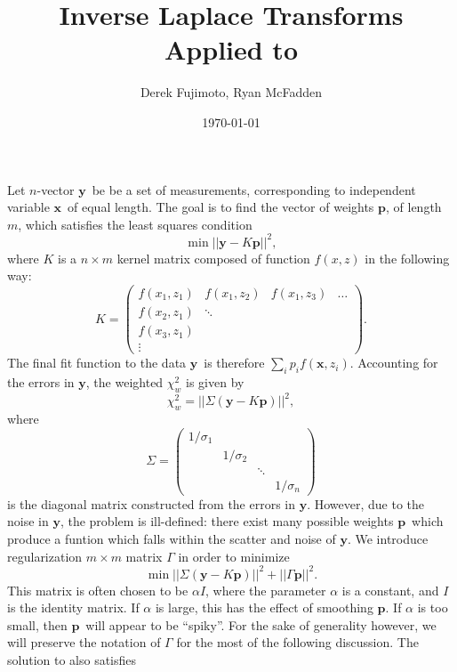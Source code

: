 \documentclass{article}
\title{Inverse Laplace Transforms Applied to \bnmr}
\author{Derek Fujimoto, Ryan McFadden}
\date{\today}
\newcommand{\y}{\ensuremath{\bm{y}}}
\newcommand{\p}{\ensuremath{\bm{p}}}
\newcommand{\x}{\ensuremath{\bm{x}}}
\begin{document}
\maketitle

Let $n$-vector \y\ be be a set of measurements, corresponding to independent variable \x\ of equal length. The goal is to find the vector of weights \p, of length $m$, which satisfies the least squares condition
%
\begin{equation}
\min ||\y-K\p||^2,
\end{equation}
%
where $K$ is a $n\times m$ kernel matrix composed of function $f(x,z)$ in the following way:
%
\begin{equation}\label{eq:K}
K = \left(
	\begin{array}{cccc}
	f(x_1,z_1) & f(x_1,z_2) & f(x_1,z_3) & \hdots \\
	f(x_2,z_1) & \ddots & & \\
	f(x_3,z_1) & & &  \\
	\vdots
	\end{array}
\right).
\end{equation}
%
The final fit function to the data \y\ is therefore $\sum_i p_i f(\x,z_i)$. Accounting for the errors in \y, the weighted $\chi^2_w$ is given by 
%
\begin{equation}
\chi^2_w = ||\Sigma(\y-K\p)||^2,
\end{equation}
%
where
%
\begin{equation}
\Sigma = \left(
	\begin{array}{cccc}
	1/\sigma_1 & & & \\
	& 1/\sigma_2 &&\\
	&& \ddots &\\
	&&& 1/\sigma_n
	\end{array}
\right)
\end{equation}
%
is the diagonal matrix constructed from the errors in \y. However, due to the noise in \y, the problem is ill-defined: there exist many possible weights \p\ which produce a funtion which falls within the scatter and noise of \y. We introduce regularization $m\times m$ matrix $\Gamma$ in order to minimize 
%
\begin{equation}\label{eq:min2}
\min ||\Sigma(\y-K\p)||^2 + ||\Gamma\p||^2.
\end{equation}
%
This matrix is often chosen to be $\alpha I$, where the parameter $\alpha$ is a constant, and $I$ is the identity matrix. If $\alpha$ is large, this has the effect of smoothing \p. If $\alpha$ is too small, then \p\ will appear to be ``spiky''. For the sake of generality however, we will preserve the notation of $\Gamma$ for the most of the following discussion. The solution to  also satisfies 
\end{document}
